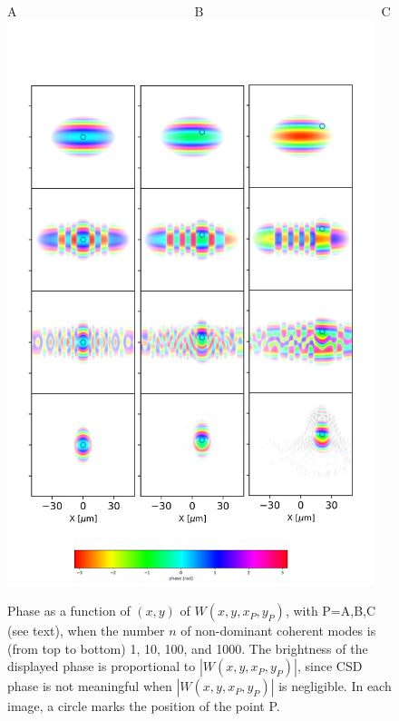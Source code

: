 \documentclass{iucr}              %
\begin{document}
\begin{figure}\label{pointP}%
\caption{Phase as a function of $(x,y)$ of $W(x,y,x_P,y_P)$, with P=A,B,C (see text), when the number $n$ of non-dominant coherent modes is (from top to bottom) 1, 10, 100, and 1000. The brightness of the displayed phase is proportional to $|W(x,y,x_P,y_P)|$, since CSD phase is not meaningful when $|W(x,y,x_P,y_P)|$ is negligible. In each image, a circle marks the position of the point P.}
A~~~~~~~~~~~~~~~~~~~~~~~~~~~~B~~~~~~~~~~~~~~~~~~~~~~~~~~~~C\\
\includegraphics[width=0.95\textwidth]{Figures/vx_id16a_ABC.png}
\end{figure}
\end{document}
